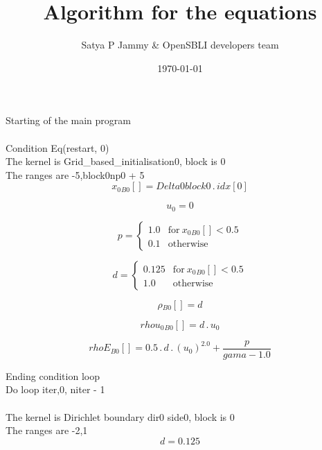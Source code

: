 \documentclass{article}
\title{Algorithm for the equations}
\author{Satya P Jammy \& OpenSBLI developers team}
\date{\today}
\begin{document}
\maketitle
\noindent Starting of the main program\\
\\\noindent Condition Eq(restart, 0)\\\noindent The kernel is Grid_based_initialisation0, block is 0\\\noindent The ranges are -5,block0np0 + 5\\\begin{dmath}{x_{0}{_{B0}}}[{}] = Delta0block0 \,.\, {idx}[{0}]\end{dmath}

\begin{dmath}u_{0} = 0\end{dmath}

\begin{dmath}p = \begin{cases} 1.0 & \text{for}\: {x_{0}{_{B0}}}[{}] < 0.5 \\0.1 & \text{otherwise} \end{cases}\end{dmath}

\begin{dmath}d = \begin{cases} 0.125 & \text{for}\: {x_{0}{_{B0}}}[{}] < 0.5 \\1.0 & \text{otherwise} \end{cases}\end{dmath}

\begin{dmath}{\rho{_{B0}}}[{}] = d\end{dmath}

\begin{dmath}{rhou_{0}{_{B0}}}[{}] = d \,.\, u_{0}\end{dmath}

\begin{dmath}{rhoE{_{B0}}}[{}] = 0.5 \,.\, d \,.\, \left(u_{0} \right)^{2.0} + \frac{p}{gama - 1.0}\end{dmath}

\noindent Ending condition loop %
\\\noindent Do loop iter,0, niter - 1\\
\\\noindent The kernel is Dirichlet boundary dir0 side0, block is 0\\\noindent The ranges are -2,1\\\begin{dmath}d = 0.125\end{dmath}
\end{document}
